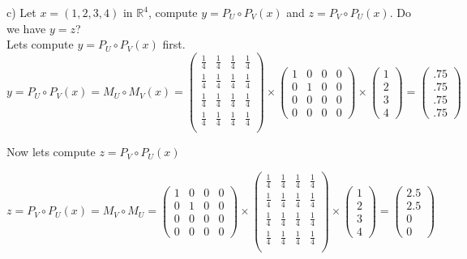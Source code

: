 \documentclass[12pt,twoside]{article}
\begin{document}
c) Let $x=(1,2,3,4)$ in $\mathbb{R}^4$, compute $y = P_U \circ P_V (x)$ and $z = P_V \circ P_U (x)$. Do we have $y = z$?
\\
Lets compute $y = P_U \circ P_V (x)$ first.
$$
    y = P_U \circ P_V (x) = M_U \circ M_V (x) = \begin{pmatrix}
        \frac{1}{4} & \frac{1}{4} & \frac{1}{4} & \frac{1}{4} \\
        \frac{1}{4} & \frac{1}{4} & \frac{1}{4} & \frac{1}{4} \\
        \frac{1}{4} & \frac{1}{4} & \frac{1}{4} & \frac{1}{4} \\
        \frac{1}{4} & \frac{1}{4} & \frac{1}{4} & \frac{1}{4} \\
    \end{pmatrix} \times    \begin{pmatrix}
    1 & 0 & 0 & 0\\
    0 & 1 & 0 & 0\\
    0 & 0 & 0 & 0\\
    0 & 0 & 0 & 0
    \end{pmatrix} \times \begin{pmatrix}
    1 \\
    2\\
    3\\
    4
    \end{pmatrix} = 
    \begin{pmatrix}
    .75 \\
    .75\\
    .75\\
    .75
    \end{pmatrix}
$$

Now lets compute $z = P_V \circ P_U (x)$

$$
 z = P_V \circ P_U(x) = M_V \circ M_U =  \begin{pmatrix}
    1 & 0 & 0 & 0\\
    0 & 1 & 0 & 0\\
    0 & 0 & 0 & 0\\
    0 & 0 & 0 & 0
    \end{pmatrix} \times 
    \begin{pmatrix}
        \frac{1}{4} & \frac{1}{4} & \frac{1}{4} & \frac{1}{4} \\
        \frac{1}{4} & \frac{1}{4} & \frac{1}{4} & \frac{1}{4} \\
        \frac{1}{4} & \frac{1}{4} & \frac{1}{4} & \frac{1}{4} \\
        \frac{1}{4} & \frac{1}{4} & \frac{1}{4} & \frac{1}{4} \\
    \end{pmatrix} \times 
     \begin{pmatrix}
    1 \\
    2\\
    3\\
    4
    \end{pmatrix} = 
 \begin{pmatrix}
    2.5\\
    2.5\\
    0\\
    0
    \end{pmatrix}
$$
\end{document}
